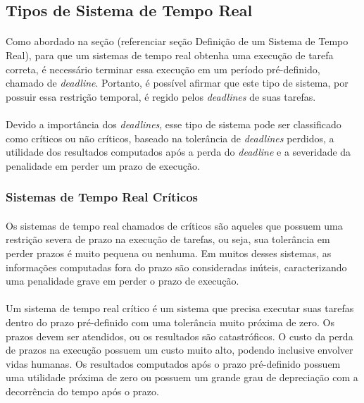 \subsection{Tipos de Sistema de Tempo Real}
\paragraph{}
Como abordado na seção (referenciar seção Definição de um Sistema de Tempo Real),
para que um sistemas de tempo real obtenha uma execução de tarefa correta,
é necessário terminar essa execução em um período pré-definido, chamado de \textit{deadline}.
Portanto, é possível afirmar que este tipo de sistema, por possuir essa restrição temporal,
é regido pelos \textit{deadlines} de suas tarefas.
\paragraph{}
Devido a importância dos \textit{deadlines}, esse tipo de sistema pode ser classificado como
críticos ou não críticos, baseado na tolerância de \textit{deadlines} perdidos, a utilidade
dos resultados computados após a perda do \textit{deadline} e a severidade da penalidade em
perder um prazo de execução.

\subsubsection{Sistemas de Tempo Real Críticos}
\paragraph{}
Os sistemas de tempo real chamados de críticos são aqueles que possuem uma restrição severa
de prazo na execução de tarefas, ou seja, sua tolerância em perder prazos é muito pequena
ou nenhuma. Em muitos desses sistemas, as informações computadas fora do prazo são consideradas
inúteis, caracterizando uma penalidade grave em perder o prazo de execução.
\paragraph{}
Um sistema de tempo real crítico é um sistema que precisa executar suas tarefas dentro do prazo
pré-definido com uma tolerância muito próxima de zero. Os prazos devem ser atendidos, ou os resultados
são catastróficos. O custo da perda de prazos na execução possuem um custo muito alto, podendo inclusive
envolver vidas humanas. Os resultados computados após o prazo pré-definido possuem uma utilidade próxima
de zero ou possuem um grande grau de depreciação com a decorrência do tempo após o prazo.~\cite{Li:2003:RCE:829584}
